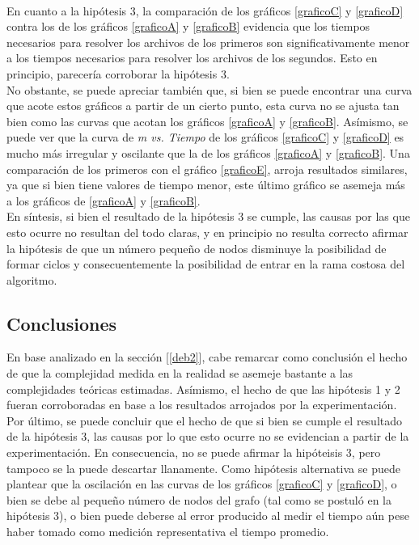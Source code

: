 \paragraph{}
En cuanto a la hipótesis 3, la comparación de los gráficos \ref{graficoC} y \ref{graficoD} contra los de los gráficos \ref{graficoA} y \ref{graficoB} evidencia que los tiempos necesarios para resolver los archivos de los primeros son significativamente menor a los tiempos necesarios para resolver los archivos de los segundos. Esto en principio, parecería corroborar la hipótesis 3.\\
No obstante, se puede apreciar también que, si bien se puede encontrar una curva que acote estos gráficos a partir de un cierto punto, esta curva no se ajusta tan bien como las curvas que acotan los gráficos \ref{graficoA} y \ref{graficoB}. Asímismo, se puede ver que la curva de \textit{m vs. Tiempo} de los gráficos \ref{graficoC} y \ref{graficoD} es mucho más irregular y oscilante que la de los gráficos \ref{graficoA} y \ref{graficoB}. Una comparación de los primeros con el gráfico \ref{graficoE}, arroja resultados similares, ya que si bien tiene valores de tiempo menor, este último gráfico se asemeja más a los gráficos de \ref{graficoA} y \ref{graficoB}.\\
En síntesis, si bien el resultado de la hipótesis 3 se cumple, las causas por las que esto ocurre no resultan del todo claras, y en principio no resulta correcto afirmar la hipótesis de que un número pequeño de nodos disminuye la posibilidad de formar ciclos y consecuentemente la posibilidad de entrar en la rama costosa del algoritmo.


\subsection{Conclusiones}
\label{conc2}
En base analizado en la sección [\ref{deb2}], cabe remarcar como conclusión el hecho de que la complejidad medida en la realidad se asemeje bastante a las complejidades teóricas estimadas. Asímismo, el hecho de que las hipótesis 1 y 2 fueran corroboradas en base a los resultados arrojados por la experimentación. \\ 
Por último, se puede concluir que el hecho de que si bien se cumple el resultado de la hipótesis 3, las causas por lo que esto ocurre no se evidencian a partir de la experimentación. En consecuencia, no se puede afirmar la hipóteisis 3, pero tampoco se la puede descartar llanamente. Como hipótesis alternativa se puede plantear que la oscilación en las curvas de los gráficos  \ref{graficoC} y \ref{graficoD}, o bien se debe al pequeño número de nodos del grafo (tal como se postuló en la hipótesis 3), o bien puede deberse al error producido al medir el tiempo aún pese haber tomado como medición representativa el tiempo promedio.


